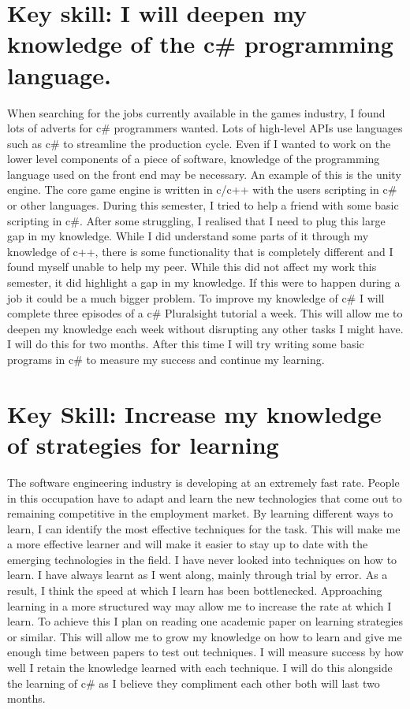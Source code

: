 \documentclass{scrartcl}
\begin{document}
\section{Key skill: I will deepen my knowledge of the c\# programming language.}
When searching for the jobs currently available in the games industry, I found lots of adverts for c\# programmers wanted. Lots of high-level APIs use languages such as c\# to streamline the production cycle. Even if I wanted to work on the lower level components of a piece of software, knowledge of the programming language used on the front end may be necessary. An example of this is the unity engine. The core game engine is written in c/c++ with the users scripting in c\# or other languages. During this semester, I tried to help a friend with some basic scripting in c\#. After some struggling, I realised that I need to plug this large gap in my knowledge. While I did understand some parts of it through my knowledge of c++, there is some functionality that is completely different and I found myself unable to help my peer. While this did not affect my work this semester, it did highlight a gap in my knowledge. If this were to happen during a job it could be a much bigger problem. To improve my knowledge of c\# I will complete three episodes of a c\# Pluralsight tutorial a week. This will allow me to deepen my knowledge each week without disrupting any other tasks I might have. I will do this for two months. After this time I will try writing some basic programs in c\# to measure my success and continue my learning.

\section{Key Skill: Increase my knowledge of strategies for learning }
The software engineering industry is developing at an extremely fast rate. People in this occupation have to adapt and learn the new technologies that come out to remaining competitive in the employment market. By learning different ways to learn, I can identify the most effective techniques for the task. This will make me a more effective learner and will make it easier to stay up to date with the emerging technologies in the field. I have never looked into techniques on how to learn. I have always learnt as I went along, mainly through trial by error. As a result, I think the speed at which I learn has been bottlenecked. Approaching learning in a more structured way may allow me to increase the rate at which I learn. To achieve this I plan on reading one academic paper on learning strategies or similar. This will allow me to grow my knowledge on how to learn and give me enough time between papers to test out techniques. I will measure success by how well I retain the knowledge learned with each technique. I will do this alongside the learning of c\# as I believe they compliment each other both will last two months. 



\end{document}
